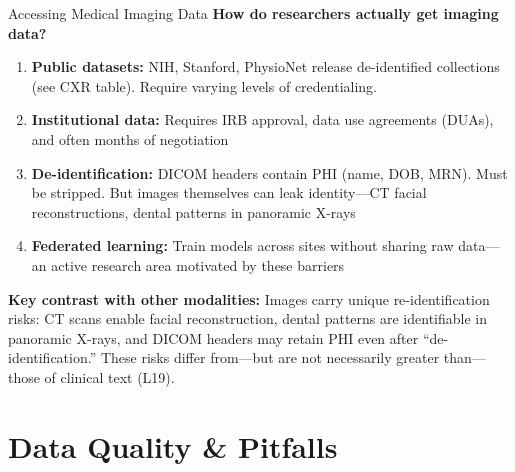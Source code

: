 \documentclass[aspectratio=169,10pt]{beamer}
\begin{document}
\begin{frame}{Accessing Medical Imaging Data}
\textbf{How do researchers actually get imaging data?}
\begin{enumerate}
    \item \textbf{Public datasets:} NIH, Stanford, PhysioNet release de-identified collections (see CXR table). Require varying levels of credentialing.
    \item \textbf{Institutional data:} Requires IRB approval, data use agreements (DUAs), and often months of negotiation
    \pause
    \item \textbf{De-identification:} DICOM headers contain PHI (name, DOB, MRN). Must be stripped. But images themselves can leak identity---CT facial reconstructions, dental patterns in panoramic X-rays
    \item \textbf{Federated learning:} Train models across sites without sharing raw data---an active research area motivated by these barriers
\end{enumerate}

\vspace{0.2em}
\pause
\textbf{Key contrast with other modalities:} Images carry unique re-identification risks: CT scans enable facial reconstruction, dental patterns are identifiable in panoramic X-rays, and DICOM headers may retain PHI even after ``de-identification.'' These risks differ from---but are not necessarily greater than---those of clinical text (L19).
\end{frame}

\section{Data Quality \& Pitfalls}
\end{document}
